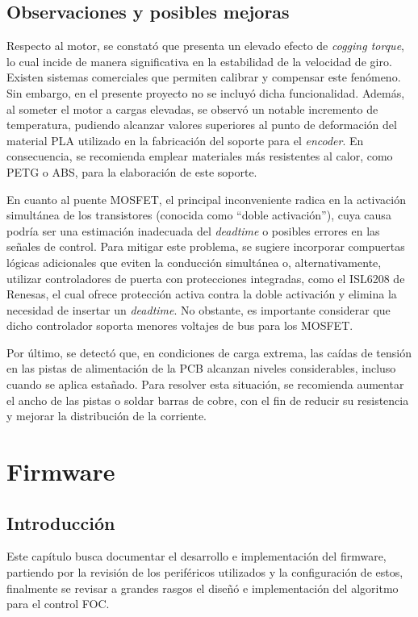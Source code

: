 \documentclass[11pt]{report}
\begin{document}
\newpage
\section{Observaciones y posibles mejoras}

Respecto al motor, se constató que presenta un elevado efecto de \emph{cogging torque}, lo cual incide de manera significativa en la estabilidad de la velocidad de giro. Existen sistemas comerciales que permiten calibrar y compensar este fenómeno. Sin embargo, en el presente proyecto no se incluyó dicha funcionalidad. Además, al someter el motor a cargas elevadas, se observó un notable incremento de temperatura, pudiendo alcanzar valores superiores al punto de deformación del material PLA utilizado en la fabricación del soporte para el \emph{encoder}. En consecuencia, se recomienda emplear materiales más resistentes al calor, como PETG o ABS, para la elaboración de este soporte.

En cuanto al puente MOSFET, el principal inconveniente radica en la activación simultánea de los transistores (conocida como “doble activación”), cuya causa podría ser una estimación inadecuada del \emph{deadtime} o posibles errores en las señales de control. Para mitigar este problema, se sugiere incorporar compuertas lógicas adicionales que eviten la conducción simultánea o, alternativamente, utilizar controladores de puerta con protecciones integradas, como el ISL6208 de Renesas, el cual ofrece protección activa contra la doble activación y elimina la necesidad de insertar un \emph{deadtime}. No obstante, es importante considerar que dicho controlador soporta menores voltajes de bus para los MOSFET.

Por último, se detectó que, en condiciones de carga extrema, las caídas de tensión en las pistas de alimentación de la PCB alcanzan niveles considerables, incluso cuando se aplica estañado. Para resolver esta situación, se recomienda aumentar el ancho de las pistas o soldar barras de cobre, con el fin de reducir su resistencia y mejorar la distribución de la corriente.

\newpage
\chapter{Firmware}
\section{Introducción}
Este capítulo busca documentar el desarrollo e implementación del firmware, partiendo por la revisión de los periféricos utilizados y la configuración de estos, finalmente se revisar a grandes rasgos el diseñó e implementación del algoritmo para el control FOC.
\end{document}
